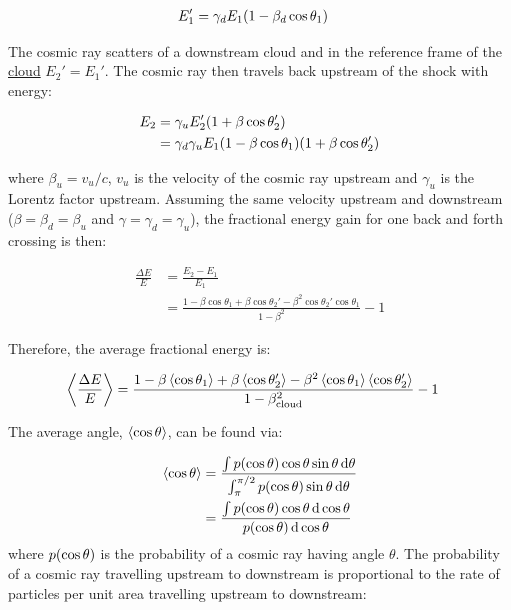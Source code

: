 \begin{equation}
    \begin{aligned}
        E_1'&=\gamma_d E_1\qty(1-\beta_d \cos\theta_1)
    \end{aligned}
\end{equation}

\noindent The cosmic ray scatters of a downstream cloud and in the reference frame of the \underline{cloud} $E_2'=E_1'$. The cosmic ray then travels back upstream of the shock with energy:

\begin{equation}
    \begin{aligned}
        E_2&=\gamma_u E_2'\qty(1+\beta\cos\theta_2') \\
        &=\gamma_d\gamma_u E_1 \qty(1-\beta \cos\theta_1)\qty(1+\beta\cos\theta_2')
    \end{aligned}
\end{equation}

\noindent where $\beta_u=v_u/c$, $v_u$ is the velocity of the cosmic ray upstream and $\gamma_u$ is the Lorentz factor upstream. Assuming the same velocity upstream and downstream ($\beta=\beta_d=\beta_u$ and $\gamma=\gamma_d=\gamma_u$), the fractional energy gain for one back and forth crossing is then:

\begin{equation}
    \begin{aligned}
    \frac{\Delta E}{E}&=\frac{E_2-E_1}{E_1} \\
&=\frac{1-\beta\cos\theta_1+\beta\cos\theta_2'-\beta^2\cos\theta_2'\cos\theta_1}{1-\beta^2}-1
    \end{aligned} 
\end{equation}

\noindent Therefore, the average fractional energy is:

\begin{equation}
    \begin{aligned}
    \left\langle \frac{\Delta E}{E} \right\rangle
	&=\frac{1-\beta\left\langle \cos\theta_1 \right\rangle+\beta\left\langle \cos\theta_2' \right\rangle-\beta^2\left\langle \cos\theta_1 \right\rangle\left\langle \cos\theta_2' \right\rangle}{1-\beta_\text{cloud}^2}-1
    \end{aligned} 
\end{equation}

\noindent The average angle, $\left\langle \cos\theta \right\rangle$, can be found via:

\begin{equation}
    \begin{aligned}
        \left\langle \cos\theta \right\rangle&=\frac{\int p\qty(\cos\theta)\cos\theta\sin\theta \dd{\theta}}{\int_\pi^{\pi/2}p\qty(\cos\theta)\sin\theta \dd{\theta}} \\
        &=\frac{\int p\qty(\cos\theta)\cos\theta\dd{\cos\theta}}{p\qty(\cos\theta) \dd{\cos\theta}}
    \end{aligned}
\end{equation}
\noindent where $p\qty(\cos\theta)$ is the probability of a cosmic ray having angle $\theta$. The probability of a cosmic ray travelling upstream to downstream is proportional to the rate of particles per unit area travelling upstream to downstream:


